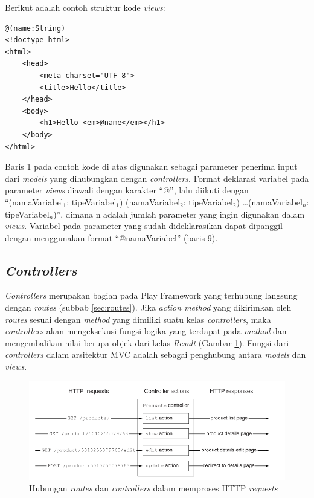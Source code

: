 Berikut adalah contoh struktur kode \textit{views}:

\begin{lstlisting}
@(name:String)
<!doctype html>
<html>
	<head>
		<meta charset="UTF-8">
		<title>Hello</title>
	</head>
	<body>
		<h1>Hello <em>@name</em></h1>
	</body>
</html>
\end{lstlisting}

Baris 1 pada contoh kode di atas digunakan sebagai parameter penerima input dari \textit{models} yang dihubungkan dengan \textit{controllers}. Format deklarasi variabel pada parameter \textit{views} diawali dengan karakter ``@'', lalu diikuti dengan ``(namaVariabel$_1$: tipeVariabel$_1$) (namaVariabel$_2$: tipeVariabel$_2$) \ldots (namaVariabel$_n$: tipeVariabel$_n$)'', dimana n adalah jumlah parameter yang ingin digunakan dalam \textit{views}. Variabel pada parameter yang sudah dideklarasikan dapat dipanggil dengan menggunakan format ``@namaVariabel'' (baris 9).

\subsection{\textit{Controllers}}
\label{sec:controllers}
\textit{Controllers} merupakan bagian pada Play Framework yang terhubung langsung dengan \textit{routes} (subbab \ref{sec:routes}). Jika \textit{action method} yang dikirimkan oleh \textit{routes} sesuai dengan \textit{method} yang dimiliki suatu kelas \textit{controllers}, maka \textit{controllers} akan mengeksekusi fungsi logika yang terdapat pada \textit{method} dan mengembalikan nilai berupa objek dari kelas \textit{Result} (Gambar \ref{fig:2_controllers1}). Fungsi dari \textit{controllers} dalam arsitektur MVC adalah sebagai penghubung antara \textit{models} dan \textit{views}. 

\begin{figure}[htbp]
	\centering	
		\includegraphics[scale=0.7]{Gambar/2_controllers1.PNG}
	\caption{Hubungan \textit{routes} dan \textit{controllers} dalam memproses HTTP \textit{requests}\cite{playforjava}}
	\label{fig:2_controllers1}
\end{figure}

